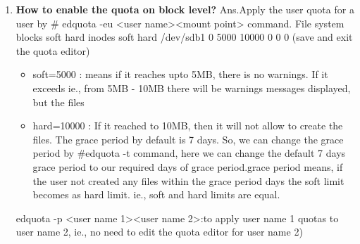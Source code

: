 \begin{enumerate}
    \item \textbf{How to enable the quota on block level?}
    \newline
    Ans.Apply the user quota for a user by  # edquota   -eu    <user name><mount point>    command.
    File system	blocks		soft		hard		inodes      	soft      
    \newline
    hard	/dev/sdb1	     0		5000	              10000		     0	
    0	   0	(save and exit the quota editor)
      \begin{itemize}
         \item soft=5000 : means if it reaches  upto  5MB, there is no warnings. If  it exceeds  ie., from 5MB  -  10MB there will be warnings messages displayed, but the files 
         \item hard=10000 : If it reached to 10MB, then it will not allow to create the files. The grace period by default 	is 7 days. So, we can change the grace period by   #edquota    -t    command,  here we can      change the default  7 days grace period  to  our required days of grace period.grace period  means, if the user not created any files within the grace period days the soft limit becomes as  hard limit. ie., soft and hard limits are equal.
      \end{itemize}
      \newline
      edquota    -p    <user name 1><user name 2>:to apply  user name 1 quotas to user name 2, ie., no 							           need to edit the quota editor for user name 2)
    
    \bigskip
    \bigskip


\end{enumerate}
